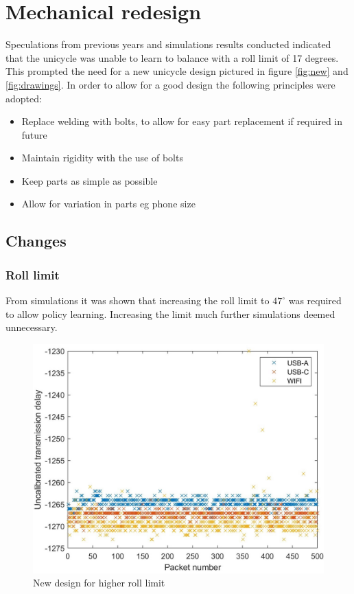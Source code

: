 \documentclass[twoside,twocolumn,12pt]{article}
\begin{document}
\section{Mechanical redesign}
Speculations from previous years and simulations results conducted indicated that the unicycle was unable to learn to balance with a roll limit of 17 degrees. This prompted the need for a new unicycle design pictured in figure \ref{fig:new} and \ref{fig:drawings}. In order to allow for a good design the following principles were adopted:

\begin{itemize}
\item Replace welding with bolts, to allow for easy part replacement if required in future
\item Maintain rigidity with the use of bolts
\item Keep parts as simple as possible
\item Allow for variation in parts eg phone size
\end{itemize}

\subsection{Changes}
\subsubsection{Roll limit}
From simulations it was shown that increasing the roll limit to $47^{\circ}$ was required to allow policy learning. Increasing the limit much further simulations deemed unnecessary.

\begin{figure}
  \centering
    \includegraphics[width=\linewidth]{all3}
  \caption{New design for higher roll limit}
  \label{fig:newline}
\end{figure}
\end{document}
